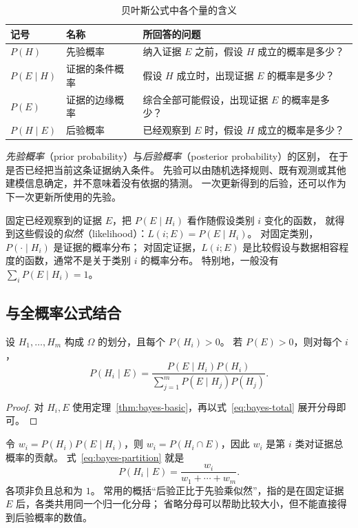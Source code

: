 \documentclass[UTF8,12pt,a4paper,fontset=fandol]{ctexart}
\begin{document}
\begin{table}[htbp]
  \centering
  \caption{贝叶斯公式中各个量的含义}
  \label{tab:bayes-terms}
  \begin{tabularx}{\textwidth}{l l Y}
    \toprule
    记号 & 名称 & 所回答的问题 \\
    \midrule
    $P(H)$ & 先验概率 & 纳入证据 $E$ 之前，假设 $H$ 成立的概率是多少？ \\
    $P(E\mid H)$ & 证据的条件概率 & 假设 $H$ 成立时，出现证据 $E$ 的概率是多少？ \\
    $P(E)$ & 证据的边缘概率 & 综合全部可能假设，出现证据 $E$ 的概率是多少？ \\
    $P(H\mid E)$ & 后验概率 & 已经观察到 $E$ 时，假设 $H$ 成立的概率是多少？ \\
    \bottomrule
  \end{tabularx}
\end{table}

\emph{先验概率}（prior probability）与\emph{后验概率}（posterior probability）的区别，
在于是否已经把当前这条证据纳入条件。
先验可以由随机选择规则、既有观测或其他建模信息确定，并不意味着没有依据的猜测。
一次更新得到的后验，还可以作为下一次更新所使用的先验。

固定已经观察到的证据 $E$，把 $P(E\mid H_i)$ 看作随假设类别 $i$ 变化的函数，
就得到这些假设的\emph{似然}（likelihood）：$L(i;E)=P(E\mid H_i)$。
对固定类别，$P(\cdot\mid H_i)$ 是证据的概率分布；
对固定证据，$L(i;E)$ 是比较假设与数据相容程度的函数，通常不是关于类别 $i$ 的概率分布。
特别地，一般没有 $\sum_iP(E\mid H_i)=1$。

\subsection{与全概率公式结合}

\begin{theorem}[有限划分下的贝叶斯公式]
\label{thm:bayes-partition}
设 $H_1,\ldots,H_m$ 构成 $\Omega$ 的划分，且每个 $P(H_i)>0$。
若 $P(E)>0$，则对每个 $i$，
\begin{equation}
  P(H_i\mid E)
  =\frac{P(E\mid H_i)P(H_i)}
  {\displaystyle\sum_{j=1}^{m}P(E\mid H_j)P(H_j)}.
  \label{eq:bayes-partition}
\end{equation}
\end{theorem}
\begin{proof}
对 $H_i,E$ 使用定理~\ref{thm:bayes-basic}，再以式~\eqref{eq:bayes-total} 展开分母即可。
\end{proof}

令 $w_i=P(H_i)P(E\mid H_i)$，则 $w_i=P(H_i\cap E)$，因此 $w_i$ 是第 $i$ 类对证据总概率的贡献。
式~\eqref{eq:bayes-partition} 就是
\[
  P(H_i\mid E)=\frac{w_i}{w_1+\cdots+w_m}.
\]
各项非负且总和为 $1$。
常用的概括“后验正比于先验乘似然”，指的是在固定证据 $E$ 后，各类共用同一个归一化分母；
省略分母可以帮助比较大小，但不能直接得到后验概率的数值。
\end{document}
